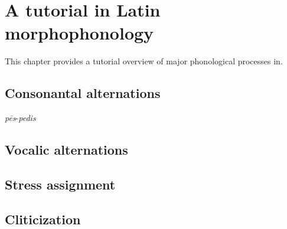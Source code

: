 \chapter{A tutorial in Latin morphophonology}
\label{tutorial}

This chapter provides a tutorial overview of major phonological processes in.

\section{Consonantal alternations}

\emph{pēs}-\emph{pedis}

\section{Vocalic alternations}

\section{Stress assignment}

\section{Cliticization}
